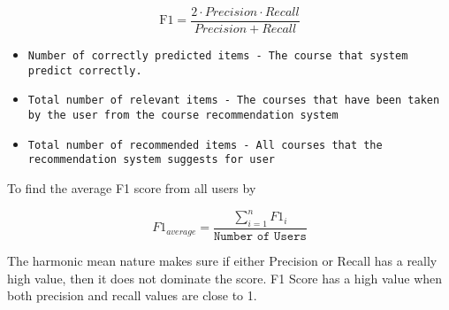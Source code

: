 \begin{equation}
    \text{F1} = \frac{2⋅Precision⋅Recall}{Precision+Recall}
\end{equation}

\begin{itemize}
    \item \texttt{Number of correctly predicted items - The course that system predict correctly.}
    \item \texttt{Total number of relevant items - The courses that have been taken by the user from the course recommendation system}
    \item \texttt{Total number of recommended items - All courses that the recommendation system suggests for user}
\end{itemize}

\noindent To find the average F1 score from all users by

\begin{equation}
    \text{$F1_{average}$} = \frac{\sum_{i=1}^{n}F1_{i}}{\texttt{Number of Users}}
\end{equation}

\noindent The harmonic mean nature makes sure if either Precision or Recall has a really high value, then it does not dominate the score. F1 Score has a high value when both precision and recall values are close to 1.